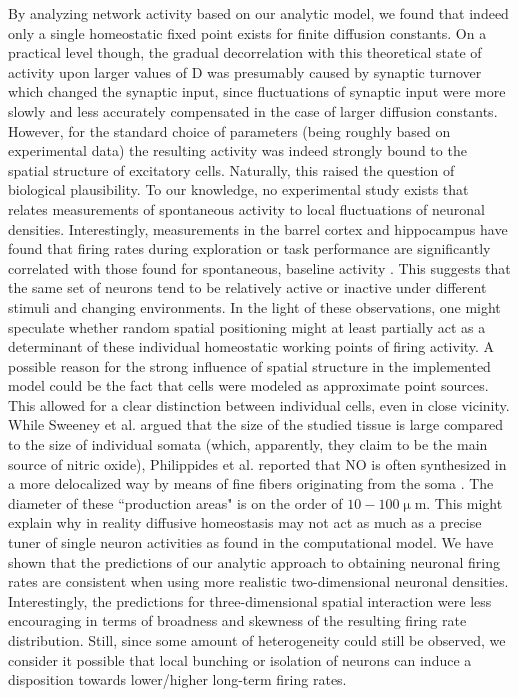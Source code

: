 \documentclass[10pt,letterpaper]{article}
\begin{document}
By analyzing network activity based on our analytic model, we found that indeed only a single homeostatic fixed point exists for finite diffusion constants. On a practical level though, the gradual decorrelation with this theoretical state of activity upon larger values of $\mathrm{D}$ was presumably caused by synaptic turnover which changed the synaptic input, since fluctuations of synaptic input were more slowly and less accurately compensated in the case of larger diffusion constants. However, for the standard choice of parameters (being roughly based on experimental data) the resulting activity was indeed strongly bound to the spatial structure of excitatory cells. Naturally, this raised the question of biological plausibility. To our knowledge, no experimental study exists that relates measurements of spontaneous activity to local fluctuations of neuronal densities. Interestingly, measurements in the barrel cortex and hippocampus have found that firing rates during exploration or task performance are significantly correlated with those found for spontaneous, baseline activity \cite{OConnor_2010,Mizuseki_2013}. This suggests that the same set of neurons tend to be relatively active or inactive under different stimuli and changing environments. In the light of these observations, one might speculate whether random spatial positioning might at least partially act as a determinant of these individual homeostatic working points of firing activity. A possible reason for the strong influence of spatial structure in the implemented model could be the fact that cells were modeled as approximate point sources. This allowed for a clear distinction between individual cells, even in close vicinity. While Sweeney et al. argued that the size of the studied tissue is large compared to the size of individual somata (which, apparently, they claim to be the main source of nitric oxide), Philippides et al. reported that NO is often synthesized in a more delocalized way by means of fine fibers originating from the soma \cite{Philippides_2005}. The diameter of these ``production areas" is on the order of $\mathrm{10-100 \upmu m}$. This might explain why in reality diffusive homeostasis may not act as much as a precise tuner of single neuron activities as found in the computational model. We have shown that the predictions of our analytic approach to obtaining neuronal firing rates are consistent when using more realistic two-dimensional neuronal densities. Interestingly, the predictions for three-dimensional spatial interaction were less encouraging in terms of broadness and skewness of the resulting firing rate distribution. Still, since some amount of heterogeneity could still be observed, we consider it possible that local bunching or isolation of neurons can induce a disposition towards lower/higher long-term firing rates.
\end{document}
